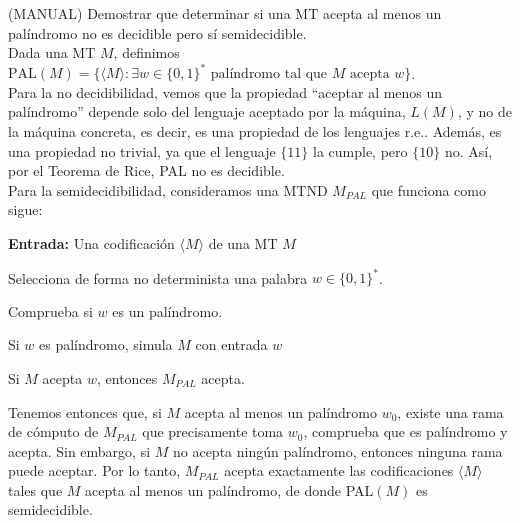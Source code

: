 \begin{ejercicio}\label{ejercicio:ej9}
    (MANUAL) Demostrar que determinar si una MT acepta al menos un palíndromo no es
    decidible pero sí semidecidible. \\

    Dada una MT $M$, definimos $\text{PAL}(M) = 
    \{\langle M \rangle : \exists w \in \{0,1\}^{*} \text{ palíndromo tal que } M \text{ acepta } w\}$. \\

    Para la no decidibilidad, vemos que la propiedad ``aceptar al menos un palíndromo'' depende solo del lenguaje aceptado
    por la máquina, $L(M)$, y no de la máquina concreta, es decir, es una propiedad de los lenguajes r.e.. Además, 
    es una propiedad no trivial, ya que el lenguaje $\{11\}$ la cumple, pero $\{10\}$ no. Así, por el Teorema de Rice, 
    PAL no es decidible. \\

    Para la semidecidibilidad, consideramos una MTND $M_{PAL}$ que funciona como sigue:

    \begin{algorithm}
        \caption{MTND $M_{PAL}$}
        \label{algorithm:pal-semidecidible}
        \begin{algorithmic}
            \State \textbf{Entrada:} Una codificación $\langle M \rangle$ de una MT $M$

            \State Selecciona de forma no determinista una palabra $w \in \{0,1\}^{*}$.

            \State Comprueba si $w$ es un palíndromo. 
            
            \State Si $w$ es palíndromo, simula $M$ con entrada $w$

            \State Si $M$ acepta $w$, entonces $M_{PAL}$ acepta.
        \end{algorithmic}
    \end{algorithm}

    Tenemos entonces que, si $M$ acepta al menos un palíndromo $w_0$, existe una rama de cómputo de $M_{PAL}$ que 
    precisamente toma $w_0$, comprueba que es palíndromo y acepta. Sin embargo, si $M$ no acepta ningún palíndromo, 
    entonces ninguna rama puede aceptar. Por lo tanto, $M_{PAL}$ acepta exactamente las codificaciones $\langle M \rangle$
    tales que $M$ acepta al menos un palíndromo, de donde PAL$(M)$ es semidecidible.

\end{ejercicio}



